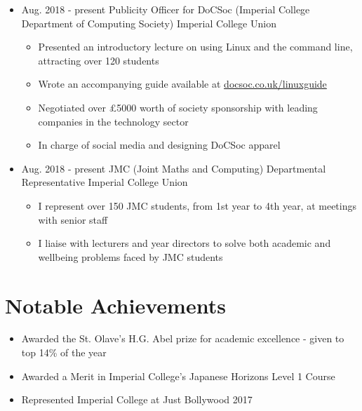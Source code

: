 \documentclass[11pt,a4paper,sans]{moderncv}        %
\begin{document}
\begin{itemize}

\item{
\cventry
{Aug. 2018 - present}
{Publicity Officer for DoCSoc (Imperial College Department of Computing Society)}
{Imperial College Union}
{}{}{
\begin{itemize}
\item Presented an introductory lecture on using Linux and the command line, attracting over 120 students
\item Wrote an accompanying guide available at \href{https://docsoc.co.uk/linuxguide}{docsoc.co.uk/linuxguide}
\item Negotiated over £5000 worth of society sponsorship with leading companies in the technology sector
\item In charge of social media and designing DoCSoc apparel
\end{itemize}
}}

\item{
\cventry
{Aug. 2018 - present}
{JMC (Joint Maths and Computing) Departmental Representative}
{Imperial College Union}
{}{}{
\begin{itemize}
\item I represent over 150 JMC students, from 1st year to 4th year, at meetings with senior staff
\item I liaise with lecturers and year directors to solve both academic and wellbeing problems faced by JMC students
\end{itemize}
}}

\end{itemize}

\section{Notable Achievements}

\begin{itemize}

\item Awarded the St. Olave's H.G. Abel prize for academic excellence - given to top 14\% of the year

\item Awarded a Merit in Imperial College's Japanese Horizons Level 1 Course

\item Represented Imperial College at Just Bollywood 2017

\end{itemize}
\end{document}
